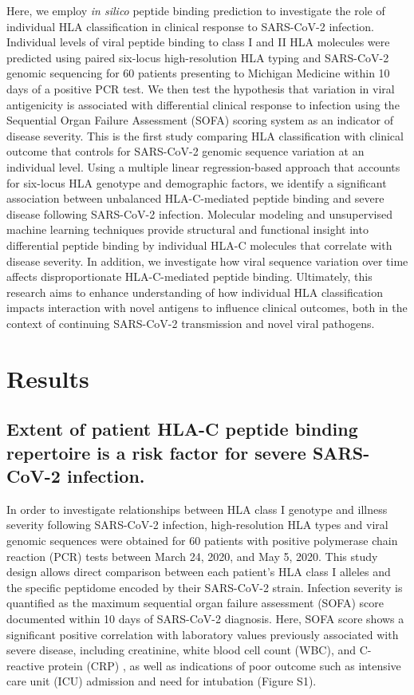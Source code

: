\documentclass[utf8]{frontiersinFPHY_FAMS} %
\begin{document}
Here, we employ \textit{in silico} peptide binding prediction to investigate the role of individual HLA classification in clinical response to SARS-CoV-2 infection. Individual levels of viral peptide binding to class I and II HLA molecules were predicted using paired six-locus high-resolution HLA typing and SARS-CoV-2 genomic sequencing for 60 patients presenting to Michigan Medicine within 10 days of a positive PCR test. We then test the hypothesis that variation in viral antigenicity is associated with differential clinical response to infection using the Sequential Organ Failure Assessment (SOFA) scoring system as an indicator of disease severity. This is the first study comparing HLA classification with clinical outcome that controls for SARS-CoV-2 genomic sequence variation at an individual level. Using a multiple linear regression-based approach that accounts for six-locus HLA genotype and demographic factors, we identify a significant association between unbalanced HLA-C-mediated peptide binding and severe disease following SARS-CoV-2 infection. Molecular modeling and unsupervised machine learning techniques provide structural and functional insight into differential peptide binding by individual HLA-C molecules that correlate with disease severity. In addition, we investigate how viral sequence variation over time affects disproportionate HLA-C-mediated peptide binding. Ultimately, this research aims to enhance understanding of how individual HLA classification impacts interaction with novel antigens to influence clinical outcomes, both in the context of continuing SARS-CoV-2 transmission and novel viral pathogens.

\section{Results}
\subsection*{Extent of patient HLA-C peptide binding repertoire is a risk factor for severe SARS-CoV-2 infection.} In order to investigate relationships between HLA class I genotype and illness severity following SARS-CoV-2 infection, high-resolution HLA types and viral genomic sequences were obtained for 60 patients with positive polymerase chain reaction (PCR) tests between March 24, 2020, and May 5, 2020.  This study design allows direct comparison between each patient’s HLA class I alleles and the specific peptidome encoded by their SARS-CoV-2 strain. Infection severity is quantified as the maximum sequential organ failure assessment (SOFA) score documented within 10 days of SARS-CoV-2 diagnosis. Here, SOFA score shows a significant positive correlation with laboratory values previously associated with severe disease, including creatinine, white blood cell count (WBC), and C-reactive protein (CRP) \citep{32533986, 32533986}, as well as indications of poor outcome such as intensive care unit (ICU) admission and need for intubation (Figure S1).
\end{document}
